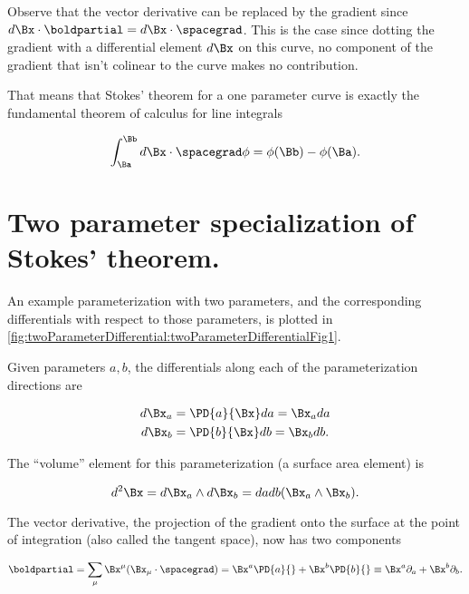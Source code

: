 Observe that the vector derivative can be replaced by the gradient since \( d\Bx \cdot \boldpartial = d\Bx \cdot \spacegrad \).
This is the case since dotting the
gradient with a differential element \( d\Bx \) on this curve, no component of the gradient that isn't colinear to the curve makes no contribution.

That means that Stokes' theorem for a one parameter curve is exactly the fundamental theorem of calculus for line integrals

\begin{dmath}\label{eqn:stokesTheoremCore:80}
\int_{\Ba}^{\Bb} d\Bx \cdot \spacegrad \phi = \phi(\Bb) - \phi(\Ba).
\end{dmath}

\section{Two parameter specialization of Stokes' theorem.}

An example parameterization with two parameters, and the corresponding differentials with respect to those parameters, is plotted in
\cref{fig:twoParameterDifferential:twoParameterDifferentialFig1}.


Given parameters \( a, b \), the differentials along each of the parameterization directions are

\begin{dmath}\label{eqn:stokesTheoremCore:100}
\begin{aligned}
d\Bx_a &= \PD{a}{\Bx} da = \Bx_a da \\
d\Bx_b &= \PD{b}{\Bx} db = \Bx_b db.
\end{aligned}
\end{dmath}

The ``volume'' element for this parameterization (a surface area element) is

\begin{equation}\label{eqn:stokesTheoremCore:120}
d^2 \Bx
=
d\Bx_a \wedge
d\Bx_b
=
da db (\Bx_a \wedge \Bx_b).
\end{equation}

The vector derivative, the projection of the gradient onto the surface at the point of integration (also called the tangent space), now has two components

\begin{dmath}\label{eqn:stokesTheoremCore:200}
\boldpartial
=
\sum_\mu \Bx^\mu (\Bx_\mu \cdot \spacegrad)
=
\Bx^a \PD{a}{}
+
\Bx^b \PD{b}{}
\equiv
\Bx^a \partial_a
+
\Bx^b \partial_b.
\end{dmath}

